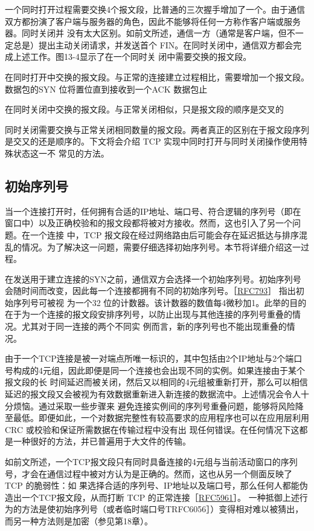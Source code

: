 一个同时打开过程需要交换4个报文段，比普通的三次握手增加了一个。由于通信双方都扮演了客户端与服务器的角色，因此不能够将任何一方称作客户端或服务器。同时关闭并
没有太大区别。如前文所述，通信一方（通常是客户端，但不一定总是）提出主动关闭请求，并发送首个
FIN。在同时关闭中，通信双方都会完成上述工作。图13-4显示了在一个同时关
闭中需要交换的报文段。

在同时打开中交换的报文段。与正常的连接建立过程相比，需要增加一个报文段。数据包的SYN 位将置位直到接收到一个ACK 数据包止

在同时关闭中交换的报文段。与正常关闭相似，只是报文段的顺序是交叉的

同时关闭需要交换与正常关闭相同数量的报文段。两者真正的区别在于报文段序列是交又的还是顺序的。下文将会介绍 TCP 实现中同时打开与同时关闭操作使用特殊状态这一不
常见的方法。
\subsection{初始序列号} \label{ssec:initseq}
当一个连接打开时，任何拥有合适的IP地址、端口号、符合逻辑的序列号（即在窗口中）以及正确校验和的报文段都将被对方接收。然而，这也引入了另一个问题。在一个连接
中，TCP 报文段在经过网络路由后可能会存在延迟抵达与排序混乱的情况。为了解决这一问题，需要仔细选择初始序列号。本节将详细介绍这一过程。

在发送用于建立连接的SYN之前，通信双方会选择一个初始序列号。初始序列号会随时间而改变，因此每一个连接都拥有不同的初始序列号。［\href{https://datatracker.ietf.org/doc/html/rfc793#section-3.3}{RFC793}］
指出初始序列号可被视
为一个32
位的计数器。该计数器的数值每4微秒加1。此举的目的在于为一个连接的报文段安排序列号，以防止出现与其他连接的序列号重叠的情况。尤其对于同一连接的两个不同实
例而言，新的序列号也不能出现重叠的情况。

由于一个TCP连接是被一对端点所唯一标识的，其中包括由2个IP地址与2个端口号构成的4元组，因此即便是同一个连接也会出现不同的实例。如果连接由于某个报文段的长
时间延迟而被关闭，然后又以相同的4元组被重新打开，那么可以相信延迟的报文段又会被视为有效数据重新进入新连接的数据流中。上述情况会令人十分烦恼。通过采取一些步骤来
避免连接实例间的序列号重叠问题，能够将风险降至最低。即便如此，一个对数据完整性有较高要求的应用程序也可以在应用层利用 CRC
或校验和保证所需数据在传输过程中没有出
现任何错误。在任何情况下这都是一种很好的方法，并已普遍用于大文件的传输。

如前文所述，一个TCP报文段只有同时具备连接的4元组与当前活动窗口的序列号，才会在通信过程中被对方认为是正确的。然而，这也从另一个侧面反映了
TCP 的脆弱性：如
果选择合适的序列号、IP地址以及端口号，那么任何人都能伪造出一个TCP报文段，从而打断 TCP
的正常连接［\href{https://datatracker.ietf.org/doc/html/rfc5961#section-5}{RFC5961}］。
一种抵御上述行为的方法是使初始序列号（或者临时端口号TRFC6056］）变得相对难以被猜出，而另一种方法则是加密（参见第18章）。

